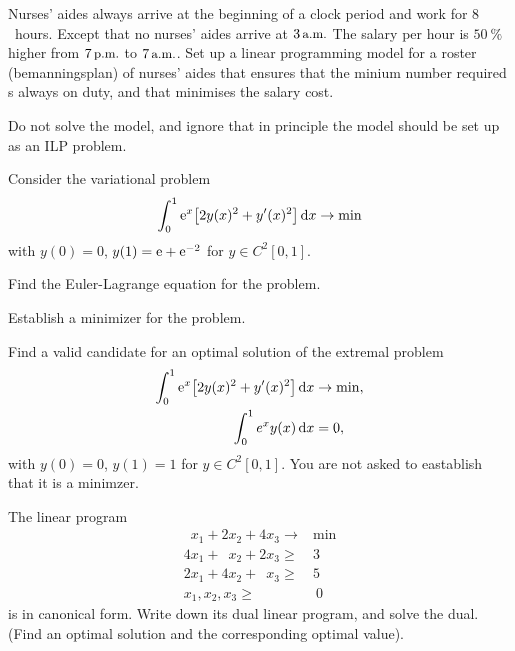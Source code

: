 Nurses' aides always arrive at the beginning of a clock period and work for
$8$~hours. Except that no nurses' aides arrive at $3\AM$ The salary per hour is $\SI{50}{\percent}$ higher from $7\PM$ to $7\AM$. Set up a linear programming model for a roster (bemanningsplan) of nurses' aides that ensures that the minium number required s always on duty, and that minimises the salary cost.

Do not solve the model, and ignore that in principle the model should be set up as an ILP problem.

\Problem

Consider the variational problem
%
\begin{equation}
    \int_0^1 \e^x \bigl[ 2 y(x)^2 + y'(x)^2 \bigr] \dx \to \min
\end{equation}
%
with $y(0)=0$, $y(1) = \mathrm{e} + \mathrm{e}^{-2}$ for $y \in C^2[0, 1]$.

\begin{subproblem}
    Find the Euler-Lagrange equation for the problem.
\end{subproblem}

\begin{subproblem}
    Establish a minimizer for the problem.
\end{subproblem}

\begin{subproblem}
    Find a valid candidate for an optimal solution of the extremal problem
    \begin{align}
        \int_0^1 \e^x \bigl[ 2 y(x)^2 + y'(x)^2 \bigr] \dx 
        & \to \min, \\
        \int_0^1 e^x y(x) \dx & = 0,
    \end{align}
    with $y(0) = 0$, $y(1) = 1$ for $y \in C^2[0,1]$. You are not asked to eastablish that it is a minimzer.
\end{subproblem}


\Problem

\begin{subproblem}
    \label{subproblem:MAT-2202-03-05-2015-4a}
    The linear program
    \begin{align*}
        \phantom{2}x_1 + 2 x_2 + 4x_3 \to &\min \\
        4x_1 + \phantom{2}x_2 + 2x_3 \geq{}&{}3 \\
        2x_1 + 4x_2 + \phantom{4}x_3 \geq{}&{}5 \\
        x_1, x_2,x_3 \geq & \ 0 
    \end{align*}
    is in canonical form. Write down its dual linear program, and solve the dual.
    (Find an optimal solution and the corresponding optimal value).
\end{subproblem}

